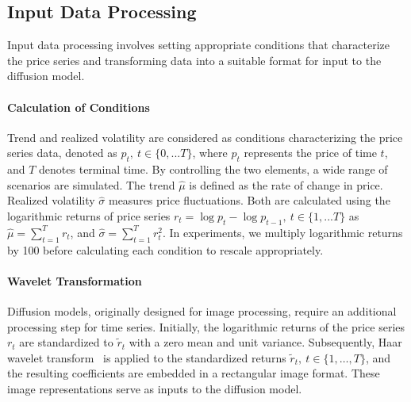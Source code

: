 \documentclass{article}
\begin{document}

\subsection{Input Data Processing}\label{Sec:input_data_processing}

Input data processing involves setting appropriate conditions that characterize the price series and transforming data into a suitable format for input to the diffusion model.

\paragraph{Calculation of Conditions}

Trend and realized volatility are considered as conditions characterizing the price series data, denoted as $p_t,~t\in\{0,...T\}$, where $p_t$ represents the price of time $t$, and $T$ denotes terminal time. By controlling the two elements, a wide range of scenarios are simulated. The trend $\hat{\mu}$ is defined as the rate of change in price. Realized volatility $\hat{\sigma}$ measures price fluctuations. Both are calculated using the logarithmic returns of price series $r_t=\log p_{t} - \log p_{t-1}, ~t\in\{1,...T\}$ as $\hat{\mu} = \sum_{t=1}^{T} r_t$, and $\hat{\sigma} = \sum_{t=1}^{T} r_{t}^2$.
In experiments, we multiply logarithmic returns by 100 before calculating each condition to rescale appropriately.


\paragraph{Wavelet Transformation}

Diffusion models, originally designed for image processing, require an additional processing step for time series. Initially, the logarithmic returns of the price series $r_t$ are standardized to $\tilde{r}_t$ with a zero mean and unit variance. Subsequently, Haar wavelet transform~\cite{wavelet} is applied to the standardized returns $\tilde{r}_t,~t\in\{1, \dots, T \}$, and the resulting coefficients are embedded in a rectangular image format. These image representations serve as inputs to the diffusion model.
\end{document}

